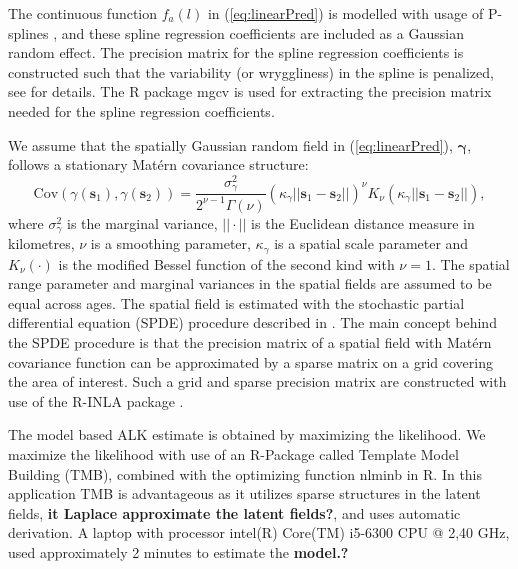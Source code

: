 \documentclass[a4paper 12pt]{article}
\numberwithin{equation}{section}
\begin{document}
The continuous function $f_a(l)$ in (\ref{eq:linearPred}) is modelled with usage of P-splines \citep{wood2017generalized}, and these spline regression coefficients are included as a Gaussian random effect. The precision matrix for the spline regression coefficients is constructed such that the variability (or wryggliness) in the spline is penalized, see \citet[page 239]{wood2017generalized} for details. The R package mgcv \citep{wood2015package} is used for extracting the precision matrix needed for the spline regression coefficients.

\indent We assume that the spatially Gaussian random field in (\ref{eq:linearPred}), $\pmb{\gamma}$, follows a stationary Mat\'{e}rn covariance structure:
\begin{equation}\label{eq:matern}
 \text{Cov}(\gamma(\mathbf{s}_1),\gamma(\mathbf{s}_2)) = \frac{\sigma^2_{\gamma}}{2^{\nu-1}\Gamma(\nu)}(\kappa_{\gamma}||\mathbf{s}_1 -\mathbf{s}_2||)^{\nu}K_{\nu}(\kappa_{\gamma}||\mathbf{s}_1-\mathbf{s}_2||),
\end{equation}
where $\sigma^2_{\gamma}$ is the marginal variance, $||\cdot||$ is the Euclidean distance measure in kilometres, $\nu$ is a smoothing parameter, $\kappa_{\gamma}$ is a spatial scale parameter and $K_{\nu}(\cdot)$ is the modified Bessel function of the second kind with $\nu = 1$. The spatial range parameter and marginal variances in the spatial fields are assumed to be equal across ages. The spatial field is estimated with the stochastic partial differential equation (SPDE) procedure described in \citet{lindgren2011explicit}. The main concept behind the SPDE procedure is that the precision matrix of a spatial field with Mat\'{e}rn  covariance function can be approximated by a sparse matrix on a grid covering the area of interest. Such a grid and sparse precision matrix are constructed with use of the R-INLA package \citep{rue2009approximate}.

The model based ALK estimate is obtained by maximizing the likelihood. We maximize the likelihood with use of an R-Package called Template Model Building ({\sffamily TMB}),  \citep{kristensen2015tmb} combined with the optimizing function {\sffamily nlminb} in R. In this application {\sffamily TMB} is advantageous as it utilizes sparse structures in the latent fields, {\bf it Laplace approximate the latent fields?}, and uses automatic derivation. A laptop with  processor intel(R) Core(TM) i5-6300 CPU @ 2,40 GHz, used approximately 2 minutes  to estimate the {\bf model.? }
\end{document}
